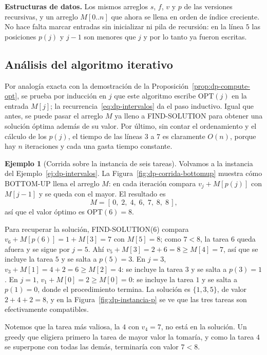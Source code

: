 \documentclass[12pt, spanish, oneside, openany]{book}
\newenvironment{estructuras}%
  {\begin{center}\begin{minipage}{0.93\textwidth}\begin{mdframed}[style=estrbox]%
   \small\textbf{Estructuras de datos.}\;}%
  {\end{mdframed}\end{minipage}\end{center}}
\newcommand{\alg}[1]{#1}
\theoremstyle{uprightplain}
\theoremstyle{definition}
\newtheorem{ejemplo}[teorema]{Ejemplo}
\theoremstyle{remark}
\theoremstyle{definition}
\newcommand{\OPT}{\mathrm{OPT}} %
\begin{document}
\begin{estructuras}
Los mismos arreglos $s$, $f$, $v$ y $p$ de las versiones recursivas, y un
arreglo $M[0..n]$ que ahora se llena en orden de índice creciente. No hace
falta marcar entradas sin inicializar ni pila de recursión: en la línea $5$ las
posiciones $p(j)$ y $j-1$ son menores que $j$ y por lo tanto ya fueron
escritas.
\end{estructuras}

\subsection{Análisis del algoritmo iterativo}

Por analogía exacta con la demostración de la Proposición~\ref{prop:dp-compute-opt}, se prueba por inducción en $j$ que este algoritmo escribe $\OPT(j)$ en la entrada $M[j]$; la recurrencia~\eqref{eq:dp-intervalos} da el paso inductivo. Igual que antes, se puede pasar el arreglo $M$ ya lleno a \alg{FIND-SOLUTION} para obtener una solución óptima además de su valor. Por último, sin contar el ordenamiento y el cálculo de los $p(j)$, el tiempo de las líneas $3$ a $7$ es claramente $O(n)$, porque hay $n$ iteraciones y cada una gasta tiempo constante.

\begin{ejemplo}[Corrida sobre la instancia de seis tareas]
\label{ej:dp-corrida-intervalos}
Volvamos a la instancia del Ejemplo~\ref{ej:dp-intervalos}. La Figura~\ref{fig:dp-corrida-bottomup} muestra cómo \alg{BOTTOM-UP} llena el arreglo $M$: en cada iteración compara $v_j+M[p(j)]$ con $M[j-1]$ y se queda con el mayor. El resultado es
\[
M = [\,0,\;2,\;4,\;6,\;7,\;8,\;8\,],
\]
así que el valor óptimo es $\OPT(6)=8$.

Para recuperar la solución, \alg{FIND-SOLUTION}($6$) compara $v_6+M[p(6)]=1+M[3]=7$ con $M[5]=8$; como $7<8$, la tarea $6$ queda afuera y se sigue por $j=5$. Ahí $v_5+M[3]=2+6=8\ge M[4]=7$, así que se incluye la tarea $5$ y se salta a $p(5)=3$. En $j=3$, $v_3+M[1]=4+2=6\ge M[2]=4$: se incluye la tarea $3$ y se salta a $p(3)=1$. En $j=1$, $v_1+M[0]=2\ge M[0]=0$: se incluye la tarea $1$ y se salta a $p(1)=0$, donde el procedimiento termina. La solución es $\{1,3,5\}$, de valor $2+4+2=8$, y en la Figura~\ref{fig:dp-instancia-p} se ve que las tres tareas son efectivamente compatibles.

Notemos que la tarea más valiosa, la $4$ con $v_4=7$, no está en la solución. Un greedy que eligiera primero la tarea de mayor valor la tomaría, y como la tarea $4$ se superpone con todas las demás, terminaría con valor $7<8$.
\end{ejemplo}
\end{document}
